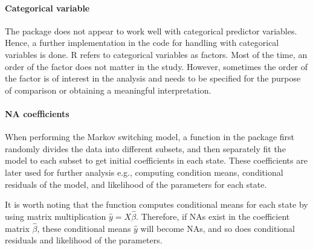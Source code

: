 \paragraph*{Categorical variable}

The package does not appear to work well with categorical predictor
variables. Hence, a further implementation in the code for handling
with categorical variables is done. R refers to categorical variables
as factors. Most of the time, an order of the factor does not matter
in the study. However, sometimes the order of the factor is of interest
in the analysis and needs to be specified for the purpose of comparison
or obtaining a meaningful interpretation. 

\paragraph*{NA coefficients}

When performing the Markov switching model, a function in the package
first randomly divides the data into different subsets, and then separately
fit the model to each subset to get initial coefficients in each state.
These coefficients are later used for further analysis e.g., computing
condition means, conditional residuals of the model, and likelihood
of the parameters for each state.

It is worth noting that the function computes conditional means for
each state by using matrix multiplication $\ensuremath{\hat{y}=X\hat{\beta}}$.
Therefore, if NAs exist in the coefficient matrix $\hat{\beta}$,
these conditional means $\hat{y}$ will become NAs, and so does conditional
residuals and likelihood of the parameters.

